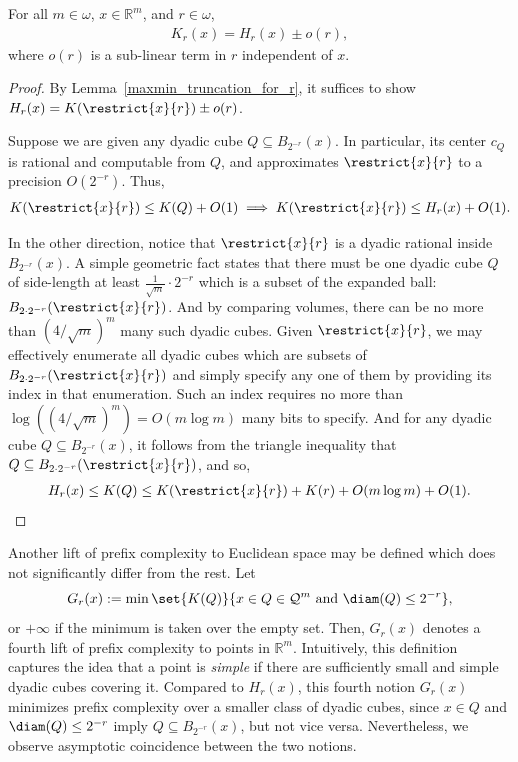 \begin{proposition}
    For all $m \in \omega$, $x \in \mathbb{R}^m$, and $r \in \omega$,
    \begin{align*}
        K_r(x) = H_r(x) \pm o(r),
    \end{align*}
    where $o(r)$ is a sub-linear term in $r$ independent of $x$.
    \label{prop:H_and_K_Euclidean}
\end{proposition}
\begin{proof}
    By Lemma~\ref{maxmin_truncation_for_r}, it suffices to show $H_r(x) = K(\restrict{x}{r}) \pm o(r)$. 

    Suppose we are given any dyadic cube $Q \subseteq B_{2^{-r}}(x)$. In particular, its center $c_Q$ is rational and computable from $Q$, and approximates $\restrict{x}{r}$ to a precision $O(2^{-r})$. Thus,
    \begin{align*}
        K(\restrict{x}{r}) \leq K(Q) + O(1) \implies K(\restrict{x}{r}) \leq H_r(x) + O(1).
    \end{align*}
    
    In the other direction, notice that $\restrict{x}{r}$ is a dyadic rational inside $B_{2^{-r}}(x)$. A simple geometric fact states that there must be one dyadic cube $Q$ of side-length at least $\frac{1}{\sqrt{m}} \cdot 2^{-r}$ which is a subset of the expanded ball: $B_{2 \cdot 2^{-r}}(\restrict{x}{r})$. And by comparing volumes, there can be no more than $(4 / \sqrt{m})^m$ many such dyadic cubes. Given $\restrict{x}{r}$, we may effectively enumerate all dyadic cubes which are subsets of $B_{2 \cdot 2^{-r}}(\restrict{x}{r})$ and simply specify any one of them by providing its index in that enumeration. Such an index requires no more than $\log((4 / \sqrt{m})^m) = O(m \log m)$ many bits to specify. And for any dyadic cube $Q \subseteq B_{2^{-r}}(x)$, it follows from the triangle inequality that $Q \subseteq B_{2 \cdot 2^{-r}}(\restrict{x}{r})$, and so,
    \begin{align*}
         H_r(x) \leq K(Q) \leq K(\restrict{x}{r}) + K(r) + O(m \log m) + O(1).
    \end{align*}
\end{proof}
Another lift of prefix complexity to Euclidean space may be defined which does not significantly differ from the rest. Let
\begin{align*}
    G_r(x) := \min \set{K(Q)}{x \in Q \in \mathcal{Q}^m \text{ and } \diam(Q) \leq 2^{-r}},
\end{align*}
or $+\infty$ if the minimum is taken over the empty set. Then, $G_r(x)$ denotes a fourth lift of prefix complexity to points in $\mathbb{R}^m$. Intuitively, this definition captures the idea that a point is \textit{simple} if there are sufficiently small and simple dyadic cubes covering it. Compared to $H_r(x)$, this fourth notion $G_r(x)$ minimizes prefix complexity over a smaller class of dyadic cubes, since $x \in Q$ and $\diam(Q) \leq 2^{-r}$ imply $Q \subseteq B_{2^{-r}}(x)$, but not vice versa. Nevertheless, we observe asymptotic coincidence between the two notions. 


